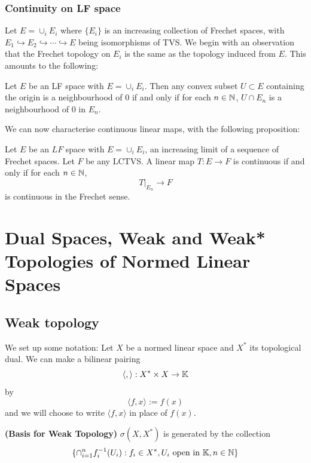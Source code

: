 \subsubsection{Continuity on LF space}
Let $E=\cup_i E_i$ where $\{E_i\}$ is an increasing collection of Frechet spaces, with $E_1\hookrightarrow E_2 \hookrightarrow \cdots \hookrightarrow E $ being isomorphisms of TVS. We begin with an observation that the Frechet topology on $E_i$ is the same as the topology induced from $E$. This amounts to the following:

\begin{proposition}
    Let $E$ be an LF space with $E=\cup_i E_i$. Then any convex subset $U\subset E$ containing the origin is a neighbourhood of $0$ if and only if for each $n\in \mathbb{N}$, $U\cap E_n$ is a neighbourhood of $0$ in $E_n$.
\end{proposition}

We can now characterise continuous linear maps, with the following proposition: 

\begin{proposition}
    Let $E$ be an $LF$ space with $E=\cup_i E_i$, an increasing limit of a sequence of Frechet spaces. Let $F$ be any LCTVS. A linear map $T:E\to F$ is continuous if and only if for each $n\in \mathbb{N}$, $$ T|_{E_n}\to F$$ is continuous in the Frechet sense.
\end{proposition}


\section{Dual Spaces, Weak and Weak* Topologies of Normed Linear Spaces}
\subsection{Weak topology}

We set up some notation: Let $X$ be a normed linear space and $X^*$ its topological dual. We can make a bilinear pairing $$
    \langle,\rangle: X^*\times X\to \mathbb{K}
$$
by \begin{equation}
    \langle f,x\rangle:=f(x)
\end{equation} and we will choose to write $\langle f,x\rangle$ in place of $f(x)$. 

\begin{theorem}\label{thm:Basis_for_weak}\textbf{(Basis for Weak Topology)}
    $\sigma(X,X^{*})$ is generated by the collection $$\{\cap_{i=1}^n f^{-1}_i(U_i): f_i \in X^*, U_i \text{ open in }\mathbb{K}, n\in \mathbb{N}\}$$
\end{theorem}

